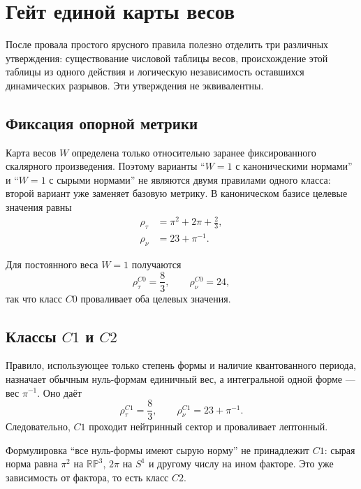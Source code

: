 \chapter{Гейт единой карты весов}

После провала простого ярусного правила полезно отделить три различных
утверждения: существование числовой таблицы весов, происхождение этой
таблицы из одного действия и логическую независимость оставшихся
динамических разрывов. Эти утверждения не эквивалентны.

\section{Фиксация опорной метрики}

Карта весов \(W\) определена только относительно заранее фиксированного
скалярного произведения. Поэтому варианты ``\(W=1\) с каноническими
нормами'' и ``\(W=1\) с сырыми нормами'' не являются двумя правилами одного
класса: второй вариант уже заменяет базовую метрику. В каноническом базисе
целевые значения равны
\begin{align}
 \rho_\tau&=\pi^2+2\pi+\frac23,\label{eq:WgateTau20260807}\\
 \rho_\nu&=23+\pi^{-1}.\label{eq:WgateNu20260807}
\end{align}

Для постоянного веса \(W=1\) получаются
\begin{equation}
 \rho_\tau^{C0}=\frac83,
 \qquad
 \rho_\nu^{C0}=24,
\end{equation}
так что класс \(C0\) проваливает оба целевых значения.

\section{Классы \(C1\) и \(C2\)}

Правило, использующее только степень формы и наличие квантованного периода,
назначает обычным нуль-формам единичный вес, а интегральной одной форме ---
вес \(\pi^{-1}\). Оно даёт
\begin{equation}
 \rho_\tau^{C1}=\frac83,
 \qquad
 \rho_\nu^{C1}=23+\pi^{-1}.
\end{equation}
Следовательно, \(C1\) проходит нейтринный сектор и проваливает лептонный.

Формулировка ``все нуль-формы имеют сырую норму'' не принадлежит \(C1\):
сырая норма равна \(\pi^2\) на \(\mathbb{RP}^3\), \(2\pi\) на \(S^1\) и
другому числу на ином факторе. Это уже зависимость от фактора, то есть
класс \(C2\).

